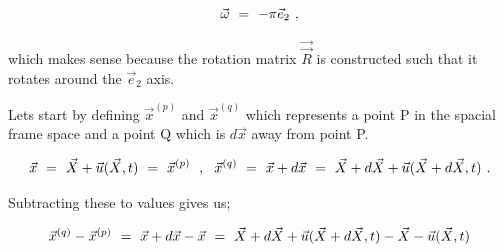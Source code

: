 \documentclass{article}
\newcounter{subsubsubsection}[subsubsection]
\begin{document}
\begin{equation} \label{eq:1}
\vec{\omega}  \hspace{0.125cm} = \hspace{0.125cm} -\pi \vec{e}_2 \hspace{0.125cm} ,
\end{equation} 

which makes sense because the rotation matrix \begin{math} \vec{\vec{R}} \end{math} is constructed such that it rotates around the \begin{math} \vec{e}_2 \end{math} axis.





Lets start by defining \begin{math}  \vec{x}^{( p )} \end{math} and \begin{math}  \vec{x}^{( q )} \end{math} which represents a point P in the spacial frame space and a point Q which is \begin{math}  d \vec{x} \end{math} away from point P.

\begin{equation} \label{eq:1}
\vec{x}  \hspace{0.125cm} = \hspace{0.125cm} \vec{X} + \vec{u}( \vec{X} , t )  \hspace{0.125cm} = \hspace{0.125cm} \vec{x}^{( p )} \hspace{0.225cm} , \hspace{0.225cm} \vec{x}^{( q )}  \hspace{0.125cm} = \hspace{0.125cm}  \vec{x} + d \vec{x}  \hspace{0.125cm} = \hspace{0.125cm} \vec{X} + d \vec{X} + \vec{u}( \vec{X} + d \vec{X} , t ) \hspace{0.125cm}  .
\end{equation} 

Subtracting these to values gives us;

\begin{equation} \label{eq:1}
 \vec{x}^{( q )} - \vec{x}^{( p )} \hspace{0.125cm} = \hspace{0.125cm}  \vec{x} + d \vec{x}  - \vec{x} \hspace{0.125cm} = \hspace{0.125cm} \vec{X} + d \vec{X} + \vec{u}( \vec{X} + d \vec{X} , t ) - \vec{X} -  \vec{u}( \vec{X} , t ) 
\end{equation} 
\end{document}
